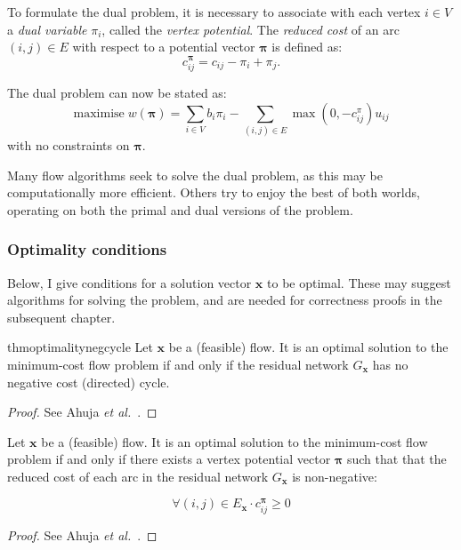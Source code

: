 To formulate the dual problem, it is necessary to associate with each vertex $i \in V$ a \emph{dual variable} $\pi_i$, called the \emph{vertex potential}. The \emph{reduced cost} of an arc $(i,j)\in E$ with respect to a potential vector $\boldsymbol{\pi}$ is defined as:
\begin{equation} \label{eq:reduced-costs}
c_{ij}^{\boldsymbol{\pi}}=c_{ij}-\pi_{i}+\pi_{j}.
\end{equation}

The dual problem can now be stated as:
\begin{equation}
\mathrm{maximise}\; w(\boldsymbol{\pi})=\sum_{i\in V}b_{i}\pi_{i}-\sum_{(i,j)\in E}\max\left(0,-c_{ij}^{\pi}\right)u_{ij}
\end{equation}
with no constraints on $\boldsymbol{\pi}$.

Many flow algorithms seek to solve the dual problem, as this may be computationally more efficient. Others try to enjoy the best of both worlds, operating on both the primal and dual versions of the problem.

\subsubsection{Optimality conditions} \label{sec:prep-flow-optimality}


Below, I give conditions for a solution vector $\mathbf{x}$ to be optimal. These may suggest algorithms for solving the problem, and are needed for correctness proofs in the subsequent chapter. \\

\begin{restatable}{thm}{optimalitynegcycle}
\label{thm:optimality-neg-cycle}
Let $\mathbf{x}$ be a (feasible) flow. It is an optimal solution to the minimum-cost flow problem if and only if the residual network $G_\mathbf{x}$ has no negative cost (directed) cycle.
\end{restatable}
\begin{proof}
See Ahuja \textit{et al.}~\cite[p.~307]{Ahuja:1993}.
\end{proof}

\begin{thm} \label{thm:optimality-reduced-cost}
Let $\mathbf{x}$ be a (feasible) flow. It is an optimal solution to the minimum-cost flow problem if and only if there exists a vertex potential vector $\boldsymbol{\pi}$ such that that the reduced cost of each arc in the residual network $G_{\mathbf{x}}$ is non-negative:

\begin{equation} \label{eq:optimality-reduced-cost}
\forall(i,j)\in E_{\mathbf{x}}\cdot c_{ij}^{\boldsymbol{\pi}}\geq 0
\end{equation}
\end{thm}
\begin{proof}
See Ahuja \textit{et al.}~\cite[p.~309]{Ahuja:1993}.
\end{proof}

